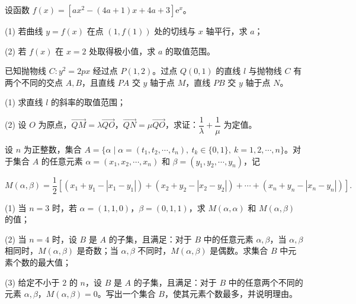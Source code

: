 \begin{question}
设函数 $f(x)=\left[ax^2-(4a+1)x+4a+3\right]\mathrm e^x$。

(1) 若曲线 $y=f(x)$ 在点 $(1,f(1))$ 处的切线与 $x$ 轴平行，求 $a$；

(2) 若 $f(x)$ 在 $x=2$ 处取得极小值，求 $a$ 的取值范围。

\end{question}
\begin{question}
已知抛物线 $C:y^2=2px$ 经过点 $P(1,2)$。过点 $Q(0,1)$ 的直线 $l$ 与抛物线 $C$ 有两个不同的交点 $A,B$，且直线 $PA$ 交 $y$ 轴于点 $M$，直线 $PB$ 交 $y$ 轴于点 $N$。

(1) 求直线 $l$ 的斜率的取值范围；

(2) 设 $O$ 为原点，$\overrightarrow{QM}=\lambda\overrightarrow{QO}$，$\overrightarrow{QN}=\mu\overrightarrow{QO}$，求证：$\dfrac1\lambda+\dfrac1\mu$ 为定值。

\end{question}
\begin{question}
设 $n$ 为正整数，集合 $A=\{\alpha\mid\alpha=(t_1,t_2,\cdots,t_n),\ t_k\in\{0,1\},\ k=1,2,\cdots,n\}$。对于集合 $A$ 的任意元素 $\alpha=(x_1,x_2,\cdots,x_n)$ 和 $\beta=(y_1,y_2,\cdots,y_n)$，记

\nopagebreak[4]
\[
M(\alpha,\beta)=\dfrac12\left[(x_1+y_1-|x_1-y_1|)+(x_2+y_2-|x_2-y_2|)+\cdots+(x_n+y_n-|x_n-y_n|)\right].
\]

(1) 当 $n=3$ 时，若 $\alpha=(1,1,0)$，$\beta=(0,1,1)$，求 $M(\alpha,\alpha)$ 和 $M(\alpha,\beta)$ 的值；

(2) 当 $n=4$ 时，设 $B$ 是 $A$ 的子集，且满足：对于 $B$ 中的任意元素 $\alpha,\beta$，当 $\alpha,\beta$ 相同时，$M(\alpha,\beta)$ 是奇数；当 $\alpha,\beta$ 不同时，$M(\alpha,\beta)$ 是偶数。求集合 $B$ 中元素个数的最大值；

(3) 给定不小于 $2$ 的 $n$，设 $B$ 是 $A$ 的子集，且满足：对于 $B$ 中的任意两个不同的元素 $\alpha,\beta$，$M(\alpha,\beta)=0$。写出一个集合 $B$，使其元素个数最多，并说明理由。

\end{question}